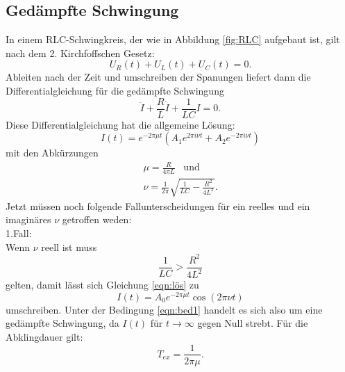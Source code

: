 \subsection{Gedämpfte Schwingung}
In einem RLC-Schwingkreis, der wie in Abbildung \ref{fig:RLC} aufgebaut ist, gilt nach dem
2. Kirchfoffschen Gesetz:
\begin{equation}
  U_{R}(t)+U_{L}(t)+U_{C}(t)=0.
  \label{eqn:max}
\end{equation}
Ableiten nach der Zeit und umschreiben der Spanungen liefert dann die Differentialgleichung
für die gedämpfte Schwingung
\begin{equation}
  \ddot{I}+\frac{R}{L}\dot{I}+\frac{1}{LC}I=0.
  \label{eqn:dgl}
\end{equation}
Diese Differentialgleichung hat die allgemeine Lösung:
\begin{equation}
  I(t)=e^{-2 \pi\mu t}(A_{1}e^{2 \pi i \nu t}+A_{2}e^{-2\pi i \nu t})
  \label{eqn:lös}
\end{equation}
mit den Abkürzungen
\begin{align*}
  \mu = \frac{R}{4\pi L} \;\;\; \text{und}\\
  \nu=\frac{1}{2\pi}\sqrt{\frac{1}{LC}-\frac{R^2}{4L^2}}.
\end{align*}
Jetzt müssen noch folgende Fallunterscheidungen für ein reelles und ein
imaginäres $\nu$ getroffen weden:\\
1.Fall:\\
Wenn $\nu$ reell ist muss
\begin{equation}
  \frac{1}{LC}>\frac{R^2}{4L^2}
  \label{eqn:bed1}
\end{equation}
gelten, damit lässt sich Gleichung \ref{eqn:lös} zu
\begin{equation}
  I(t)=A_{0}e^{-2\pi \mu t}\cos(2\pi \nu t )
\end{equation}
umschreiben. Unter der Bedingung \ref{eqn:bed1} handelt es sich also um
eine gedämpfte Schwingung, da $I(t)$ für $t \to \infty$ gegen Null strebt.
Für die Abklingdauer gilt:
\begin{equation}
  T_{ex}=\frac{1}{2\pi \mu}.
  \label{eqn:tex}
\end{equation}\\
